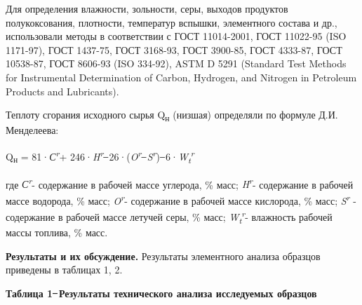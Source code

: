 Для определения влажности, зольности, серы, выходов продуктов
полукоксования, плотности, температур вспышки, элементного состава и
др., использовали методы в соответствии с ГОСТ 11014-2001, ГОСТ 11022-95
(ISO 1171-97), ГОСТ 1437-75, ГОСТ 3168-93, ГОСТ 3900-85, ГОСТ 4333-87,
ГОСТ 10538-87, ГОСТ 8606-93 (ISO 334-92), ASTM D 5291 (Standard Test
Methods for Instrumental Determination of Carbon, Hydrogen, and Nitrogen
in Petroleum Products and Lubricants).

Теплоту сгорания исходного сырья Q\textsubscript{н} (низшая) определяли
по формуле Д.И. Менделеева:

Q\textsubscript{н} = 81·\emph{С\textsuperscript{r}}+
246·\emph{H\textsuperscript{r}} ̶ 26·(\emph{O\textsuperscript{r}} ̶
\emph{S\textsuperscript{r}}) ̶
6·\emph{W\textsubscript{t}\textsuperscript{r}}

где \emph{С\textsuperscript{r}}- содержание в рабочей массе углерода, \%
масс; \emph{H\textsuperscript{r}}- содержание в рабочей массе водорода,
\% масс; \emph{O\textsuperscript{r}}- содержание в рабочей массе
кислорода, \% масс; \emph{S\textsuperscript{r}} - содержание в рабочей
массе летучей серы, \% масс;
\emph{W\textsubscript{t}\textsuperscript{r}}- влажность рабочей массы
топлива, \% масс.

{\bfseries Результаты и их обсуждение.} Результаты элементного анализа
образцов приведены в таблицах 1, 2.

{\bfseries Таблица 1 ̶ Результаты технического анализа исследуемых
образцов}

